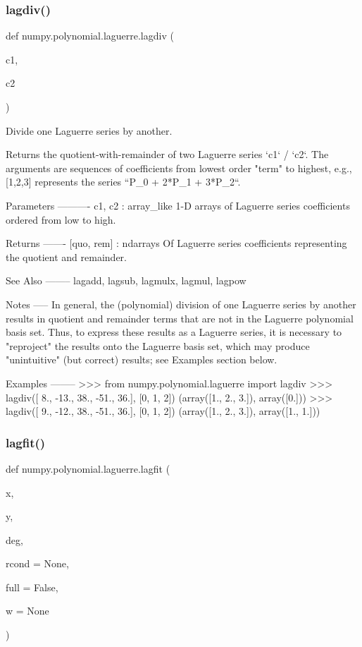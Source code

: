 \subsubsection{\texorpdfstring{lagdiv()}{lagdiv()}}
{\footnotesize\ttfamily def numpy.\+polynomial.\+laguerre.\+lagdiv (\begin{DoxyParamCaption}\item[{}]{c1,  }\item[{}]{c2 }\end{DoxyParamCaption})}

\begin{DoxyVerb}Divide one Laguerre series by another.

Returns the quotient-with-remainder of two Laguerre series
`c1` / `c2`.  The arguments are sequences of coefficients from lowest
order "term" to highest, e.g., [1,2,3] represents the series
``P_0 + 2*P_1 + 3*P_2``.

Parameters
----------
c1, c2 : array_like
    1-D arrays of Laguerre series coefficients ordered from low to
    high.

Returns
-------
[quo, rem] : ndarrays
    Of Laguerre series coefficients representing the quotient and
    remainder.

See Also
--------
lagadd, lagsub, lagmulx, lagmul, lagpow

Notes
-----
In general, the (polynomial) division of one Laguerre series by another
results in quotient and remainder terms that are not in the Laguerre
polynomial basis set.  Thus, to express these results as a Laguerre
series, it is necessary to "reproject" the results onto the Laguerre
basis set, which may produce "unintuitive" (but correct) results; see
Examples section below.

Examples
--------
>>> from numpy.polynomial.laguerre import lagdiv
>>> lagdiv([  8., -13.,  38., -51.,  36.], [0, 1, 2])
(array([1., 2., 3.]), array([0.]))
>>> lagdiv([  9., -12.,  38., -51.,  36.], [0, 1, 2])
(array([1., 2., 3.]), array([1., 1.]))\end{DoxyVerb}
 \mbox{\label{namespacenumpy_1_1polynomial_1_1laguerre_a1c0142c5afa10917e9bff853fa89ebde}} 
\subsubsection{\texorpdfstring{lagfit()}{lagfit()}}
{\footnotesize\ttfamily def numpy.\+polynomial.\+laguerre.\+lagfit (\begin{DoxyParamCaption}\item[{}]{x,  }\item[{}]{y,  }\item[{}]{deg,  }\item[{}]{rcond = {\ttfamily None},  }\item[{}]{full = {\ttfamily False},  }\item[{}]{w = {\ttfamily None} }\end{DoxyParamCaption})}

